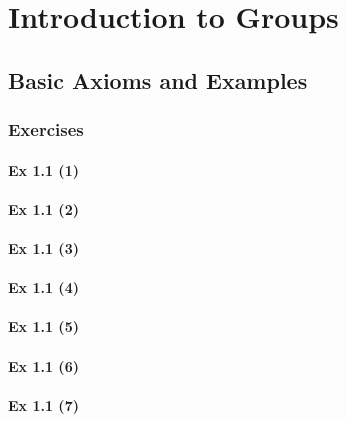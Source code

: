 \setcounter{chapter}{0}
\renewcommand{\thechapter}{1}
\chapter{Introduction to Groups}\label{ch:1}
\setcounter{equation}{0}	        %

\section{Basic Axioms and Examples}\label{sec:1.1}	
\subsection*{Exercises}\label{sec:1.1_Exercises}

\subsubsection{Ex 1.1 (1)}\label{sec:Ex_1.1.1}

\subsubsection{Ex 1.1 (2)}\label{sec:Ex_1.1.2}

\subsubsection{Ex 1.1 (3)}\label{sec:Ex_1.1.3}

\subsubsection{Ex 1.1 (4)}\label{sec:Ex_1.1.4}

\subsubsection{Ex 1.1 (5)}\label{sec:Ex_1.1.5}

\subsubsection{Ex 1.1 (6)}\label{sec:Ex_1.1.6}

\subsubsection{Ex 1.1 (7)}\label{sec:Ex_1.1.7}

